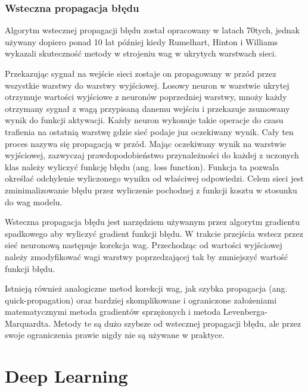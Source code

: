 \documentclass[12pt,a4paper,twoside,titlepage,openright]{book}
\begin{document}
\subsection{Wsteczna propagacja błędu}
Algorytm wstecznej propagacji błędu został opracowany w latach 70tych, jednak używany dopiero ponad 10 lat później kiedy Rumelhart, Hinton i Williams wykazali skuteczność metody w strojeniu wag w ukrytych warstwach sieci.

Przekazując sygnał na wejście sieci zostaje on propagowany w przód przez wszystkie warstwy do warstwy wyjściowej. Losowy neuron w warstwie ukrytej otrzymuje wartości wyjściowe z neuronów poprzedniej warstwy, mnoży każdy otrzymany sygnał z wagą przypisaną danemu wejściu i przekazuje zsumowany wynik do funkcji aktywacji. Każdy neuron wykonuje takie operacje do czasu trafienia na ostatnią warstwę gdzie sieć podaje juz oczekiwany wynik. Cały ten proces nazywa się propagacją w przód. Mając oczekiwany wynik na warstwie wyjściowej, zazwyczaj prawdopodobieństwo przynależności do każdej z uczonych klas należy wyliczyć funkcję błędu (ang. loss function). Funkcja ta pozwala określać odchylenie wyliczonego wyniku od właściwej odpowiedzi. Celem sieci jest zminimalizowanie błędu przez wyliczenie pochodnej z funkcji kosztu w stosunku do wag modelu.

Wsteczna propagacja błędu jest narzędziem używanym przez algorytm gradientu spadkowego aby wyliczyć gradient funkcji błędu. W trakcie przejścia wstecz przez sieć neuronową następuje korekcja wag. Przechodząc od wartości wyjściowej należy zmodyfikować wagi warstwy poprzedzającej tak by zmniejszyć wartość funkcji błędu.

Istnieją również analogiczne metod korekcji wag, jak szybka propagacja (ang. quick-propagation) oraz bardziej skomplikowane i ograniczone założeniami matematycznymi metoda gradientów sprzężonych i metoda Levenberga-Marquardta. Metody te są dużo szybsze od wstecznej propagacji błędu, ale przez swoje ograniczenia prawie nigdy nie są używane w praktyce. \cite{odkrywanieSieci}



\chapter{Deep Learning}
\end{document}

